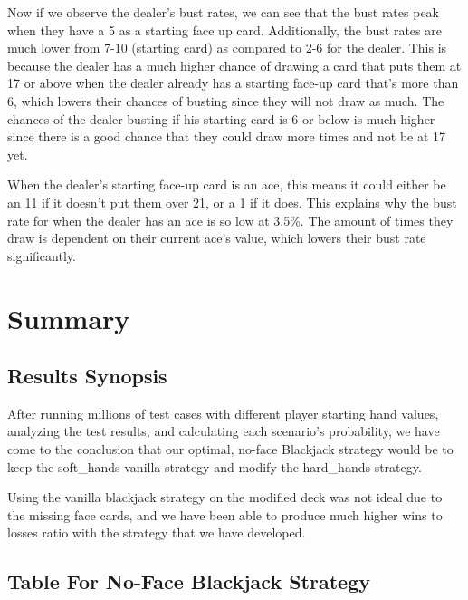 \documentclass{article}
\begin{document}
        Now if we observe the dealer's bust rates, we can see that the bust rates peak when they have a 5 as a starting face up card. Additionally, the bust rates are much lower from 7-10 (starting card) as compared to 2-6 for the dealer. This is because the dealer has a much higher chance of drawing a card that puts them at 17 or above when the dealer already has a starting face-up card that's more than 6, which lowers their chances of busting since they will not draw as much. The chances of the dealer busting if his starting card is 6 or below is much higher since there is a good chance that they could draw more times and not be at 17 yet. 

        \vspace{0.25cm}

        When the dealer's starting face-up card is an ace, this means it could either be an 11 if it doesn't put them over 21, or a 1 if it does. This explains why the bust rate for when the dealer has an ace is so low at 3.5\%. The amount of times they draw is dependent on their current ace's value, which lowers their bust rate significantly.

        
\section{Summary}
\label{sec: Summary}

        \subsection{Results Synopsis}
	\label{Results Synopsis}

        After running millions of test cases with different player starting hand values, analyzing the test results, and calculating each scenario's probability, we have come to the conclusion that our optimal, no-face Blackjack strategy would be to keep the soft\_hands vanilla strategy and modify the hard\_hands strategy. 

        Using the vanilla blackjack strategy on the modified deck was not ideal due to the missing face cards, and we have been able to produce much higher wins to losses ratio with the strategy that we have developed. 

        \subsection{Table For No-Face Blackjack Strategy}
	\label{Table For No-Face Blackjack Strategy}
         
\end{document}
